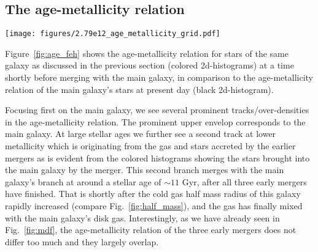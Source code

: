 \documentclass[useAMS,usenatbib]{mnras}
\begin{document}
\subsection{The age-metallicity relation}
\label{sec:age_fe}

\begin{figure*}
    \begin{centering}
        \texttt{[image: figures/2.79e12\_age\_metallicity\_grid.pdf]}
        \vspace*{-1.75em}
        \caption{
            Age-metallicity relation for the stars in the galaxy g2.79e12 (black histogram in the background). Individual panels show with color where the stars contributed by the merging dwarf galaxies reside in age-metallicity space. The panel titles highlight the cosmic time at which the merger happens, with two different mergers happening at $t = 2.57$ Gyr.
        }
        \label{fig:age_feh}
    \end{centering}
\end{figure*}

Figure~\ref{fig:age_feh} shows the age-metallicity relation for stars of the same galaxy as discussed in the previous section (colored 2d-histograms) at a time shortly before merging with the main galaxy, in comparison to the age-metallicity relation of the main galaxy's stars at present day (black 2d-histogram).

Focusing first on the main galaxy, we see several prominent tracks/over-densities in the age-metallicity relation. The prominent upper envelop corresponds to the main galaxy. At large stellar ages we further see a second track at lower metallicity which is originating from the gas and stars accreted by the earlier mergers as is evident from the colored histograms showing the stars brought into the main galaxy by the merger. This second branch merges with the main galaxy's branch at around a stellar age of $\sim11$ Gyr, after all three early mergers have finished. That is shortly after the cold gas half mass radius of this galaxy rapidly increased (compare Fig.~\ref{fig:half_mass}), and the gas has finally mixed with the main galaxy's disk gas. Interestingly, as we have already seen in Fig.~\ref{fig:mdf}, the age-metallicity relation of the three early mergers does not differ too much and they largely overlap.
\end{document}
